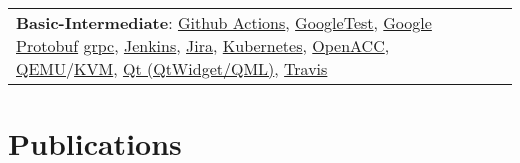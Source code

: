 \documentclass[a4paper,11pt]{article}
\begin{document}
\begin{tabularx}{\linewidth}{@{}l X@{}}
                       \textbf{Basic-Intermediate}:
                       \href{https://github.com/features/actions}{Github Actions},
                       \href{https://google.github.io/googletest/}{GoogleTest},
                       \href{https://developers.google.com/protocol-buffers}{Google Protobuf}
                       \href{https://grpc.io/}{grpc},
                       \href{https://www.jenkins.io/}{Jenkins},
                       \href{https://www.atlassian.com/es/software/jira}{Jira},
                       \href{https://kubernetes.io/}{Kubernetes},
                       \href{https://www.openacc.org/}{OpenACC},
                       \href{https://www.qemu.org/}{QEMU}/\href{https://www.linux-kvm.org/page/Main_Page}{KVM},
                       \href{https://www.qt.io/}{Qt (QtWidget/QML)},
                       \href{https://www.travis-ci.com/}{Travis} \\
\end{tabularx}

\section{Publications}
\begin{refsection}
    \nocite{*}
    \printbibliography[heading=none]
\end{refsection}


\vfill
{}
\end{document}
